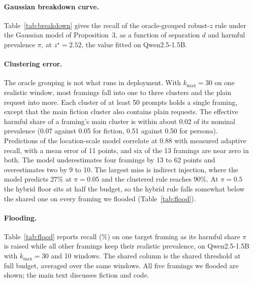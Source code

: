 \documentclass[11pt]{article}
\begin{document}
\begin{table}[t]
\centering
\resizebox{\columnwidth}{!}{}
\caption{Replication on Gemma-4-E4B-it with the frozen configuration, benign-rich traffic, 10 windows. Columns as in Table~\ref{tab:second}.}
\label{tab:gemma}
\end{table}

\paragraph{Gaussian breakdown curve.}
Table~\ref{tab:breakdown} gives the recall of the oracle-grouped robust-$z$ rule under the Gaussian model of Proposition~3, as a function of separation $d$ and harmful prevalence $\pi$, at $z^\star=2.52$, the value fitted on Qwen2.5-1.5B.

\begin{table}[t]
\centering

\caption{Recall (\%) of the oracle-grouped robust-$z$ rule under the Gaussian model, by separation $d$ and prevalence $\pi$.}
\label{tab:breakdown}
\end{table}

\paragraph{Clustering error.}
The oracle grouping is not what runs in deployment. With $k_{\max}{=}30$ on one realistic window, most framings fall into one to three clusters and the plain request into more. Each cluster of at least 50 prompts holds a single framing, except that the main fiction cluster also contains plain requests. The effective harmful share of a framing's main cluster is within about 0.02 of its nominal prevalence (0.07 against 0.05 for fiction, 0.51 against 0.50 for persona). Predictions of the location-scale model correlate at 0.88 with measured adaptive recall, with a mean error of 11 points, and six of the 13 framings are near zero in both. The model underestimates four framings by 13 to 62 points and overestimates two by 9 to 10. The largest miss is indirect injection, where the model predicts 27\% at $\pi=0.05$ and the clustered rule reaches 90\%. At $\pi=0.5$ the hybrid floor sits at half the budget, so the hybrid rule falls somewhat below the shared one on every framing we flooded (Table~\ref{tab:flood}).

\paragraph{Flooding.}
Table~\ref{tab:flood} reports recall (\%) on one target framing as its harmful share $\pi$ is raised while all other framings keep their realistic prevalence, on Qwen2.5-1.5B with $k_{\max}{=}30$ and 10 windows. The shared column is the shared threshold at full budget, averaged over the same windows. All five framings we flooded are shown; the main text discusses fiction and code.
\end{document}
